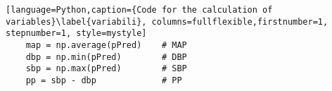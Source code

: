 \begin{lstlisting}[language=Python,caption={Code for the calculation of variables}\label{variabili}, columns=fullflexible,firstnumber=1, stepnumber=1, style=mystyle]
    map = np.average(pPred)    # MAP
    dbp = np.min(pPred)        # DBP
    sbp = np.max(pPred)        # SBP 
    pp = sbp - dbp             # PP
\end{lstlisting}

